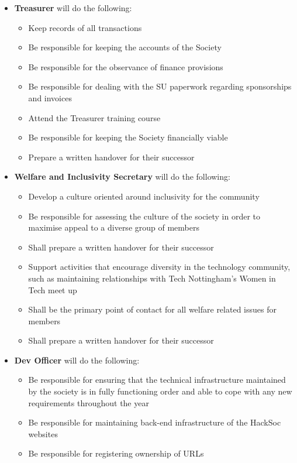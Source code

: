 \documentclass[a4paper,twoside,notitlepage,11pt]{article}
\begin{document}
\begin{itemize}
\begin{itemize}
	\end{itemize}
	\item \textbf{Treasurer} will do the following:
	\begin{itemize}
	  \item Keep records of all transactions
	  \item Be responsible for keeping the accounts of the Society
	  \item Be responsible for the observance of finance provisions
	  \item Be responsible for dealing with the SU paperwork regarding sponsorships and invoices
	  \item Attend the Treasurer training course
	  \item Be responsible for keeping the Society financially viable
	  \item Prepare a written handover for their successor
	\end{itemize}
	\item \textbf{Welfare and Inclusivity Secretary} will do the following:
	\begin{itemize} 
	  \item Develop a culture oriented around inclusivity for the community
	  \item Be responsible for assessing the culture of the society in order to maximise appeal to a diverse group of members
	  \item Shall prepare a written handover for their successor
	  \item Support activities that encourage diversity in the technology community, such as maintaining relationships with Tech Nottingham’s Women in Tech meet up
	  \item Shall be the primary point of contact for all welfare related issues for members
	  \item Shall prepare a written handover for their successor
	\end{itemize}
	\item \textbf{Dev Officer} will do the following: 
	\begin{itemize}
	  \item Be responsible for ensuring that the technical infrastructure maintained by the society is in fully functioning order and able to cope with any new requirements throughout the year
	  \item Be responsible for maintaining back-end infrastructure of the HackSoc websites
	  \item Be responsible for registering ownership of URLs

\end{itemize}
\end{itemize}
\end{document}
